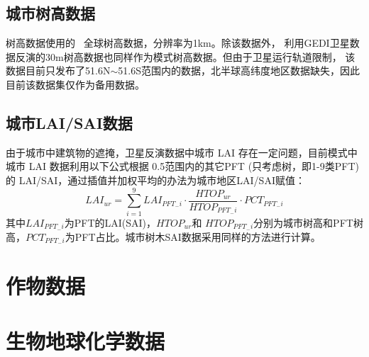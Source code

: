 \subsection{城市树高数据}\label{城市树高数据}
树高数据使用的~\citet{simard2011mapping} 全球树高数据，分辨率为1km。除该数据外， \citet{potapov2021mapping} 
利用GEDI卫星数据反演的30m树高数据也同样作为模式树高数据。但由于卫星运行轨道限制，
该数据目前只发布了51.6\textdegree N$\sim$51.6\textdegree S范围内的数据，北半球高纬度地区数据缺失，因此目前该数据集仅作为备用数据。

\subsection{城市LAI/SAI数据}\label{城市LAISAI数据}
由于城市中建筑物的遮掩，卫星反演数据中城市 LAI 存在一定问题，目前模式中城市 LAI 数据利用以下公式根据 0.5\textdegree 范围内的其它PFT (只考虑树，即1-9类PFT)的 LAI/SAI，通过插值并加权平均的办法为城市地区LAI/SAI赋值：
\begin{equation}
L A I_{u r}=\sum_{i=1}^{9} L A I_{P F T_{-} i} \cdot \frac{H T O P_{u r}}{H T O P_{P F T_{-} i}} \cdot P C T_{P F T_{-} i}
\end{equation}
其中$LAI_{PFT_{-}i}$为PFT的LAI(SAI)，$HTOP_{ur}$和 $HTOP_{PFT_{-} i}$分别为城市树高和PFT树高，$PCT_{PFT_{-} i}$为PFT占比。城市树木SAI数据采用同样的方法进行计算。

\section{作物数据}

\section{生物地球化学数据}


